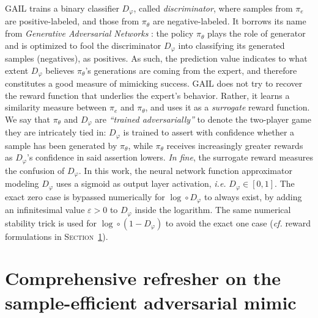 GAIL \cite{Ho2016-bv}
trains a binary classifier $D_\varphi$, called \emph{discriminator},
where samples from $\pi_e$ are positive-labeled, and those from $\pi_\theta$ are negative-labeled.
It borrows its name from \textit{Generative Adversarial Networks} \cite{Goodfellow2014-yk}:
the policy $\pi_\theta$ plays the role of generator and is optimized to fool
the discriminator $D_\varphi$ into classifying its generated samples (negatives),
as positives.
As such, the prediction value indicates to what extent $D_\varphi$ believes $\pi_\theta$'s
generations are coming from the expert, and therefore constitutes a good measure of
mimicking success.
GAIL does not try to recover the reward function that underlies the expert's behavior.
Rather, it learns a similarity measure between $\pi_e$ and $\pi_\theta$,
and uses it as a \emph{surrogate} reward function.
We say that $\pi_\theta$ and $D_\varphi$ are \textit{``trained adversarially''} to denote
the two-player game they are intricately tied in:
$D_\varphi$ is trained to assert with confidence
whether a sample has been generated by $\pi_\theta$,
while $\pi_\theta$ receives increasingly greater rewards as $D_\varphi$'s confidence in
said assertion lowers.
\textit{In fine}, the surrogate reward measures the confusion of $D_\varphi$.
In this work, the neural network function approximator modeling $D_\varphi$
uses a sigmoid as output layer activation, \textit{i.e.} $D_\varphi \in [0, 1]$.
The exact zero case is bypassed numerically for $\log \circ D_\varphi$ to always exist,
by adding an infinitesimal value $\varepsilon > 0$ to $D_\varphi$ inside the logarithm.
The same numerical stability trick is used for $\log \circ (1 - D_\varphi)$ to avoid the exact one case
(\textit{cf.} reward formulations in \textsc{Section}~\ref{bridge}).

\section{Comprehensive refresher on the sample-efficient adversarial mimic}
\label{bridge}

